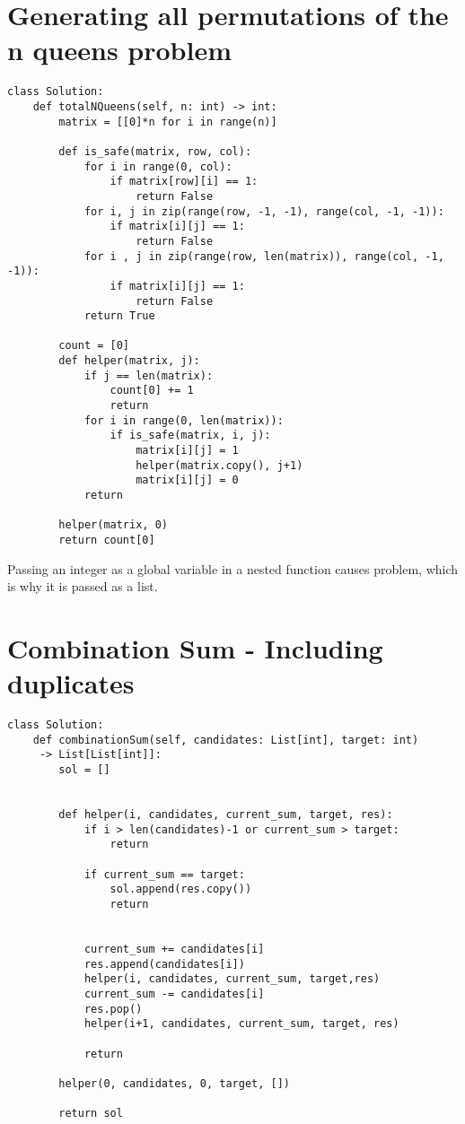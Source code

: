 \documentclass[a4]{article}
\begin{document}
\section{Generating all permutations of the n queens problem}
\begin{lstlisting}
class Solution:
    def totalNQueens(self, n: int) -> int:
        matrix = [[0]*n for i in range(n)]
        
        def is_safe(matrix, row, col):
            for i in range(0, col):
                if matrix[row][i] == 1:
                    return False
            for i, j in zip(range(row, -1, -1), range(col, -1, -1)):
                if matrix[i][j] == 1:
                    return False
            for i , j in zip(range(row, len(matrix)), range(col, -1, -1)):
                if matrix[i][j] == 1:
                    return False
            return True
        
        count = [0]
        def helper(matrix, j):
            if j == len(matrix):
                count[0] += 1
                return
            for i in range(0, len(matrix)):
                if is_safe(matrix, i, j):
                    matrix[i][j] = 1
                    helper(matrix.copy(), j+1)
                    matrix[i][j] = 0
            return
        
        helper(matrix, 0)
        return count[0]
\end{lstlisting}
Passing an integer as a global variable in a nested function causes problem, which is why it is passed as a list.

\newpage
\section{Combination Sum - Including duplicates}
\begin{lstlisting}
class Solution:
    def combinationSum(self, candidates: List[int], target: int)
     -> List[List[int]]:
        sol = []
        
        
        def helper(i, candidates, current_sum, target, res):
            if i > len(candidates)-1 or current_sum > target:
                return
            
            if current_sum == target:
                sol.append(res.copy())
                return
                
            
            current_sum += candidates[i]
            res.append(candidates[i])
            helper(i, candidates, current_sum, target,res)
            current_sum -= candidates[i]
            res.pop()
            helper(i+1, candidates, current_sum, target, res)
            
            return
        
        helper(0, candidates, 0, target, [])
        
        return sol
\end{lstlisting}
\end{document}
